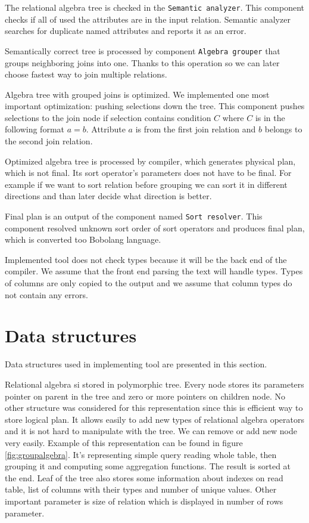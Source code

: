 The relational algebra tree is checked in the \texttt{Semantic analyzer}. This component checks if all of used the attributes are in the input relation. Semantic analyzer searches for duplicate named attributes and reports it as an error. 

Semantically correct tree is processed by component \texttt{Algebra grouper} that groups neighboring joins into one. Thanks to this operation so we can later choose fastest way to join multiple relations.

Algebra tree with grouped joins is optimized. We implemented one most important optimization: pushing selections down the tree. This component pushes selections to the join node if selection contains condition $C$ where $C$ is in the following format $a=b$. Attribute $a$ is from the first join relation and $b$ belongs to the second join relation.

Optimized algebra tree is processed by compiler, which generates physical plan, which is not final. Its sort operator's parameters does not have to be final. For example if we want to sort relation before grouping we can sort it in different directions and than later decide what direction is better.

Final plan is an output of the component named \texttt{Sort resolver}. This component resolved unknown sort order of sort operators and produces final plan, which is converted too Bobolang language.

Implemented tool does not check types because it will be the back end of the compiler. We assume that the front end parsing the text will handle types. Types of columns are only copied to the output and we assume that column types do not contain any errors.

\section{Data structures}

Data structures used in implementing tool are presented in this section.

Relational algebra si stored in polymorphic tree. Every node stores its parameters pointer on parent in the tree and zero or more pointers on children node. No other structure was considered for this representation since this is efficient way to store logical plan. It allows easily to add new types of relational algebra operators and it is not hard to manipulate with the tree. We can remove or add new node very easily. 
Example of this representation can be found in figure \ref{fig:groupalgebra}. It's representing simple query reading whole table, then grouping it and computing some aggregation functions. The result is sorted at the end. Leaf of the tree also stores some information about indexes on read table, list of columns with their types and number of unique values. Other important parameter is size of relation which is displayed in number of rows parameter.

